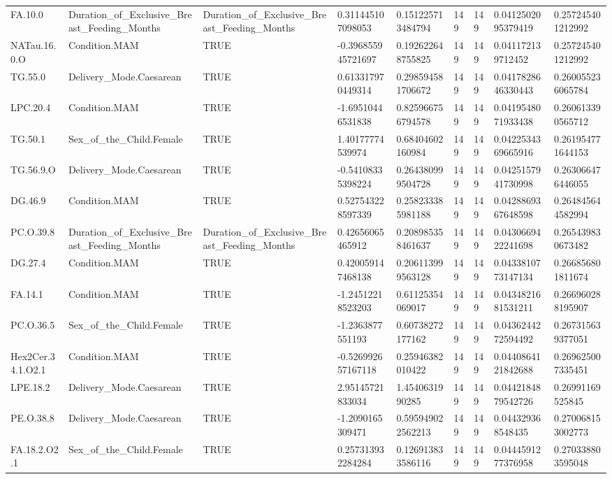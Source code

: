 \begin{longtable}{lllllllll}
FA.10.0 & Duration\_of\_Exclusive\_Breast\_Feeding\_Months & Duration\_of\_Exclusive\_Breast\_Feeding\_Months & 0.311445107098053 & 0.151225713484794 & 149 & 149 & 0.0412502095379419 & 0.257245401212992 \\
NATau.16.0.O & Condition.MAM & TRUE & -0.396855945721697 & 0.192622648755825 & 149 & 149 & 0.041172139712452 & 0.257245401212992 \\
TG.55.0 & Delivery\_Mode.Caesarean & TRUE & 0.613317970449314 & 0.298594581706672 & 149 & 149 & 0.0417828646330443 & 0.260055236065784 \\
LPC.20.4 & Condition.MAM & TRUE & -1.69510446531838 & 0.825966756794578 & 149 & 149 & 0.0419548071933438 & 0.260613390565712 \\
TG.50.1 & Sex\_of\_the\_Child.Female & TRUE & 1.40177774539974 & 0.68404602160984 & 149 & 149 & 0.0422534369665916 & 0.261954771644153 \\
TG.56.9.O & Delivery\_Mode.Caesarean & TRUE & -0.54108335398224 & 0.264380999504728 & 149 & 149 & 0.0425157941730998 & 0.263066476446055 \\
DG.46.9 & Condition.MAM & TRUE & 0.527543228597339 & 0.258233385981188 & 149 & 149 & 0.0428869367648598 & 0.264845644582994 \\
PC.O.39.8 & Duration\_of\_Exclusive\_Breast\_Feeding\_Months & Duration\_of\_Exclusive\_Breast\_Feeding\_Months & 0.42656065465912 & 0.208985358461637 & 149 & 149 & 0.0430669422241698 & 0.265439830673482 \\
DG.27.4 & Condition.MAM & TRUE & 0.420059147468138 & 0.206113999563128 & 149 & 149 & 0.0433810773147134 & 0.266856801811674 \\
FA.14.1 & Condition.MAM & TRUE & -1.24512218523203 & 0.61125354069017 & 149 & 149 & 0.0434821681531211 & 0.266960288195907 \\
PC.O.36.5 & Sex\_of\_the\_Child.Female & TRUE & -1.2363877551193 & 0.60738272177162 & 149 & 149 & 0.0436244272594492 & 0.267315639377051 \\
Hex2Cer.34.1.O2.1 & Condition.MAM & TRUE & -0.526992657167118 & 0.25946382010422 & 149 & 149 & 0.0440864121842688 & 0.269625007335451 \\
LPE.18.2 & Delivery\_Mode.Caesarean & TRUE & 2.95145721833034 & 1.4540631990285 & 149 & 149 & 0.0442184879542726 & 0.26991169525845 \\
PE.O.38.8 & Delivery\_Mode.Caesarean & TRUE & -1.2090165309471 & 0.595949022562213 & 149 & 149 & 0.044329368548435 & 0.270068153002773 \\
FA.18.2.O2.1 & Sex\_of\_the\_Child.Female & TRUE & 0.257313932284284 & 0.126913833586116 & 149 & 149 & 0.0444591277376958 & 0.270338803595048 \\

\end{longtable}
